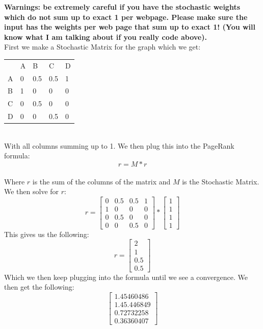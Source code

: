 \documentclass{article}
\begin{document}
\textbf{Warnings: be extremely careful if you have the stochastic weights which do not sum up to exact 1 per webpage. Please make sure the input has the weights per web page that sum up to exact 1! (You will know what I am talking about if you really code above).}
\\
First we make a Stochastic Matrix for the graph which we get:
\begin{table}[h]
    \begin{tabular}{lllll}
        & A & B   & C   & D \\
    A & 0 & 0.5 & 0.5 & 1 \\
    B & 1 & 0   & 0   & 0 \\
    C & 0 & 0.5 & 0   & 0 \\
    D & 0 & 0   & 0.5 & 0
    \end{tabular}
    \centering
\end{table}
\\
With all columns summing up to 1. We then plug this into the PageRank formula: 
\begin{equation}
    r = M*r
\end{equation}
\\
Where $r$ is the sum of the columns of the matrix and $M$ is the Stochastic Matrix. We then solve for $r$:
\begin{equation}
    r = 
    \begin{bmatrix}
        0 & 0.5 & 0.5 & 1 \\
        1 & 0 & 0 & 0 \\
        0 & 0.5 & 0 & 0 \\
        0 & 0 & 0.5 & 0
    \end{bmatrix}
    * 
    \begin{bmatrix}
        1 \\
        1 \\
        1 \\
        1
    \end{bmatrix}
\end{equation}
This gives us the following:
\begin{equation}
    r = 
    \begin{bmatrix}
        2 \\
        1 \\
        0.5 \\
        0.5
    \end{bmatrix}
\end{equation}
Which we then keep plugging into the formula until we see a convergence. We then get the following:
\begin{equation}
    \begin{bmatrix}
        1.45460486 \\
        1.45.446849 \\
        0.72732258 \\
        0.36360407
    \end{bmatrix}
\end{equation}
\end{document}
